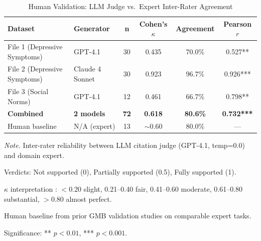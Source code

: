 \begin{table}[H]
\centering
\caption{Human Validation: LLM Judge vs.\ Expert Inter-Rater Agreement}
\label{tab:human_validation}
\begin{threeparttable}
\begin{tabular}{llcccc}
\toprule
\textbf{Dataset} & \textbf{Generator} & \textbf{n} & \textbf{Cohen's $\kappa$} & \textbf{Agreement} & \textbf{Pearson $r$} \\
\midrule
File 1 (Depressive Symptoms) & GPT-4.1 & 30 & 0.435 & 70.0\% & 0.527** \\
File 2 (Depressive Symptoms) & Claude 4 Sonnet & 30 & 0.923 & 96.7\% & 0.926*** \\
File 3 (Social Norms) & GPT-4.1 & 12 & 0.461 & 66.7\% & 0.798** \\
\midrule
\textbf{Combined} & \textbf{2 models} & \textbf{72} & \textbf{0.618} & \textbf{80.6\%} & \textbf{0.732***} \\
\midrule
Human baseline & N/A (expert) & 13 & $\sim$0.60 & 80.0\% & --- \\
\bottomrule
\end{tabular}
\begin{tablenotes}
\small
\item \textit{Note.} Inter-rater reliability between LLM citation judge (GPT-4.1, temp=0.0) and domain expert.
\item Verdicts: Not supported (0), Partially supported (0.5), Fully supported (1).
\item $\kappa$ interpretation \cite{landis1977measurement}: $<$0.20 slight, 0.21--0.40 fair, 0.41--0.60 moderate, 0.61--0.80 substantial, $>$0.80 almost perfect.
\item Human baseline from prior GMB validation studies on comparable expert tasks.
\item Significance: ** $p<0.01$, *** $p<0.001$.
\end{tablenotes}
\end{threeparttable}
\end{table}


